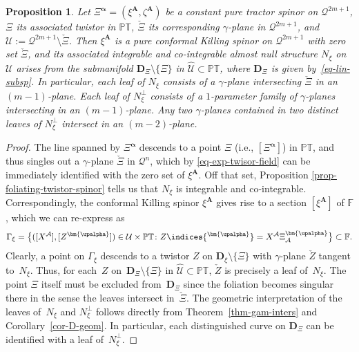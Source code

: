 \documentclass[10pt,a4paper]{amsart}
\numberwithin{equation}{section}
\newtheorem{Proposition}[Theorem]{Proposition}
 { \theoremstyle{definition}
\newtheorem{Definition}[Theorem]{Definition}
\newtheorem{Example}[Theorem]{Example}
\newtheorem{Remark}[Theorem]{Remark} }
\newcommand{\mbf} [1]{\mathbf{#1}}
\newcommand{\mc} [1]{\mathcal{#1}}
\newcommand{\ind} {\indices}
\newcommand{\PT} {\mathbb{PT}}
\newcommand{\F} {\mathbb{F}}
\begin{document}
\begin{Proposition}\label{prop-Robinson-congruence-odd}
 Let $\Xi^{\bm{\upalpha}}=(\xi^{\mbf{A}} , \zeta^{\mbf{A}})$ be a constant pure tractor spinor on $\mc{Q}^{2m+1}$, $\Xi$ its associated twistor in $\PT$, $\check{\Xi}$ its corresponding $\gamma$-plane in $\mc{Q}^{2m+1}$, and $\mc{U}:= \mc{Q}^{2m+1} \setminus \check{\Xi}$. Then $\xi^{\mbf{A}}$ is a pure conformal Killing spinor on $\mc{Q}^{2m+1}$ with zero set $\check{\Xi}$, and its associated integrable and co-integrable almost null structure $N_\xi$ on $\mc{U}$ arises from the submanifold $\mathbf{D}_\Xi \setminus \{ \Xi \}$ in $\widehat{\mc{U}} \subset \PT$, where $\mathbf{D}_\Xi$ is given by~\eqref{eq-lin-subsp}. In particular, each leaf of $N_\xi$ consists of a $\gamma$-plane intersecting $\check{\Xi}$ in an $(m-1)$-plane. Each leaf of $N_\xi^\perp$ consists of a $1$-parameter family of $\gamma$-planes intersecting in an $(m-1)$-plane. Any two $\gamma$-planes contained in two distinct leaves of $N_\xi^\perp$ intersect in an $(m-2)$-plane.
\end{Proposition}

\begin{proof}
The line spanned by $\Xi^{\bm{\upalpha}}$ descends to a point $\Xi$ (i.e., $[\Xi^{\bm{\upalpha}}]$) in $\PT$, and thus singles out a $\gamma$-plane $\check{\Xi}$ in $\mc{Q}^n$, which by \eqref{eq-exp-twisor-field} can be immediately identif\/ied with the zero set of $\xi^\mbf{A}$. Of\/f that set, Proposition \ref{prop-foliating-twistor-spinor} tells us that $N_\xi$ is integrable and co-integrable. Correspondingly, the conformal Killing spinor $\xi^{\mbf{A}}$ gives rise to a section $[\xi^{\mbf{A}}]$ of $\F$, which we can re-express as
\begin{gather*}
 \Gamma_{\xi} = \big\{ ([X^\mc{A}] , [Z^{\bm{\upalpha}}]) \in \mc{U} \times \PT \colon Z \ind{^{\bm{\upalpha}}} = X^\mc{A} \Xi _\mc{A} ^{\bm{\upalpha}} \big\} \subset \F .
\end{gather*}
Clearly, a point on $\Gamma_{\xi}$ descends to a twistor $Z$ on $\mathbf{D}_\xi \setminus \{ \Xi \}$ with $\gamma$-plane $\check{Z}$ tangent to~$N_\xi$. Thus, for each~$Z$ on~$\mathbf{D}_\Xi \setminus \{ \Xi \}$ in $\widehat{\mc{U}} \subset \PT$, $\check{Z}$ is precisely a leaf of~$N_\xi$. The point $\Xi$ itself must be excluded from~$\mathbf{D}_\Xi$ since the foliation becomes singular there in the sense the leaves intersect in~$\check{\Xi}$. The geometric interpretation of the leaves of~$N_\xi$ and $N_\xi^\perp$ follows directly from Theorem~\ref{thm-gam-inters} and Corollary~\ref{cor-D-geom}. In particular, each distinguished curve on $\mathbf{D}_\Xi$ can be identif\/ied with a leaf of~$N_\xi^\perp$.
\end{proof}
\end{document}
